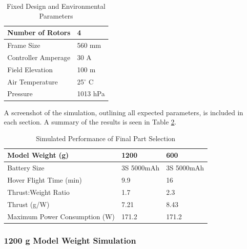 \begin{table}[H]
\label{env_param}
\centering
\begin{tabular}{|l|l|}
\hline
Number of Rotors    & 4        \\ \hline
Frame Size          & 560 mm   \\ \hline
Controller Amperage & 30 A     \\ \hline
Field Elevation     & 100 m    \\ \hline
Air Temperature     & 25$^{\circ}$ C     \\ \hline
Pressure            & 1013 hPa \\ \hline
\end{tabular}
\caption{Fixed Design and Environmental Parameters}
\end{table}

A screenshot of the simulation, outlining all expected parameters, is included in each section. A summary of the results is seen in Table \ref{summary}.

\begin{table}[]
\centering
\begin{tabular}{|l|l|l|}
\hline
\textbf{Model Weight (g)}              & \textbf{1200}       & \textbf{600}        \\ \hline
Battery Size                  & 3S 5000mAh & 3S 5000mAh \\ \hline
Hover Flight Time (min)       & 9.9        & 16         \\ \hline
Thrust:Weight Ratio           & 1.7        & 2.3        \\ \hline
Thrust (g/W)                  & 7.21       & 8.43       \\ \hline
Maximum Power Consumption (W) & 171.2      & 171.2      \\ \hline
\end{tabular}
\caption{Simulated Performance of Final Part Selection}
\label{summary}
\end{table}

\subsubsection{1200 g Model Weight Simulation}

